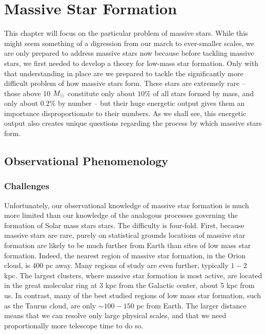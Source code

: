 \chapter{Massive Star Formation}
\label{ch:massivestar}


This chapter will focus on the particular problem of massive stars. While this might seem something of a digression from our march to ever-smaller scales, we are only prepared to address massive stars now because before tackling massive stars, we first needed to develop a theory for low-mass star formation. Only with that understanding in place are we prepared to tackle the significantly more difficult problem of how massive stars form. These stars are extremely rare -- those above 10 $M_{\odot}$ constitute only about $10\%$ of all stars formed by mass, and only about $0.2\%$ by number -- but their huge energetic output gives them an importance disproportionate to their numbers. As we shall see, this energetic output also creates unique questions regarding the process by which massive stars form.

\section{Observational Phenomenology}

\subsection{Challenges}

Unfortunately, our observational knowledge of massive star formation is much more limited than our knowledge of the analogous processes governing the formation of Solar mass stars stars. The difficulty is four-fold. First, because massive stars are rare, purely on statistical grounds locations of massive star formation are likely to be much further from Earth than sites of low mass star formation. Indeed, the nearest region of massive star formation, in the Orion cloud, is 400 pc away. Many regions of study are even further, typically $1-2$ kpc. The largest clusters, where massive star formation is most active, are located in the great molecular ring at 3 kpc from the Galactic center, about 5 kpc from us. In contrast, many of the best studied regions of low mass star formation, such as the Taurus cloud, are only $\sim 100-150$ pc from Earth. The larger distance means that we can resolve only large physical scales, and that we need proportionally more telescope time to do so.

